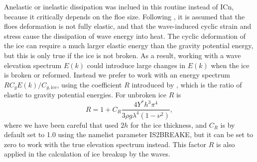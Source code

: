 Anelastic or inelastic dissipation was inclued in this routine instead of ICn, because it critically 
depends on the floe size. Following \cite{art:Bea18}, it is assumed that the floes deformation is not fully elastic, and that the wave-induced cyclic strain and stress cause the dissipation of wave energy into heat. The cyclic deformation of the ice can require a much larger elastic energy than the gravity potential 
energy, but this is only true if the ice is not broken. As a result, working with a wave elevation spectrum $E(k)$ 
could introduce large changes in $E(k)$ when the ice is broken or reformed. Instead we prefer 
to work with an energy spectrum $ R C_g E(k)/C_{g,\mathrm{ice}}$, using the coefficient $R$ introduced by \cite{art:Wad73}, which 
is the ratio of elastic to gravity potential energies. 
For unbroken ice  $R$ is 
\begin{equation}
R=1+C_R\frac{4Y^*h^3\pi^4}{3\rho g \lambda^4(1-\nu^2)},
\label{R}
\end{equation}
where we have been careful  that \cite{art:Wad73} used $2h$ for the  ice thickness, 
and $C_R$ is by default set to 1.0 using the namelist parameter {\code IS2BREAKE}, but it can 
be set to zero to work with the true elevation spectrum instead. This factor $R$ is also 
applied in the calculation of ice breakup by the waves.\\

